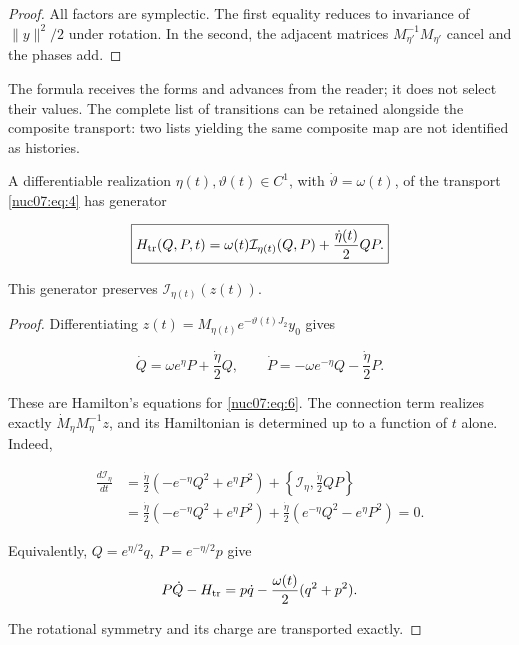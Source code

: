\begin{proof}
All factors are symplectic. The first equality reduces to invariance of \(\|y\|^2/2\) under rotation. In the second, the adjacent matrices \(M_{\eta'}^{-1}M_{\eta'}\) cancel and the phases add.
\end{proof}

The formula receives the forms and advances from the reader; it does not select their values. The complete list of transitions can be retained alongside the composite transport: two lists yielding the same composite map are not identified as histories.

\begin{proposition}
A differentiable realization \(\eta(t),\vartheta(t)\in C^1\), with \(\dot\vartheta=\omega(t)\), of the transport \eqref{nuc07:eq:4} has generator

\begin{equation}
\boxed{
H_{\rm tr}(Q,P,t)=
\omega(t)\mathcal I_{\eta(t)}(Q,P)
+\frac{\dot\eta(t)}2 QP.}
\label{nuc07:eq:6}
\end{equation}

This generator preserves \(\mathcal I_{\eta(t)}(z(t))\).
\end{proposition}

\begin{proof}
Differentiating \(z(t)=M_{\eta(t)}e^{-\vartheta(t)J_2}y_0\) gives

\[
\dot Q=\omega e^\eta P+\frac{\dot\eta}2Q,\qquad
\dot P=-\omega e^{-\eta}Q-\frac{\dot\eta}2P.
\]

These are Hamilton's equations for \eqref{nuc07:eq:6}. The connection term realizes exactly \(\dot M_\eta M_\eta^{-1}z\), and its Hamiltonian is determined up to a function of \(t\) alone. Indeed,

\begin{equation}
\begin{aligned}
\frac{d\mathcal I_\eta}{dt}
&=\frac{\dot\eta}{2}(-e^{-\eta}Q^2+e^\eta P^2)
+\left\{\mathcal I_\eta,\frac{\dot\eta}{2}QP\right\}\\
&=\frac{\dot\eta}{2}(-e^{-\eta}Q^2+e^\eta P^2)
+\frac{\dot\eta}{2}(e^{-\eta}Q^2-e^\eta P^2)=0.
\end{aligned}
\label{nuc07:eq:7}
\end{equation}

Equivalently, \(Q=e^{\eta/2}q\), \(P=e^{-\eta/2}p\) give

\begin{equation}
P\dot Q-H_{\rm tr}
=p\dot q-\frac{\omega(t)}2(q^2+p^2).
\label{nuc07:eq:8}
\end{equation}

The rotational symmetry and its charge are transported exactly.
\end{proof}

